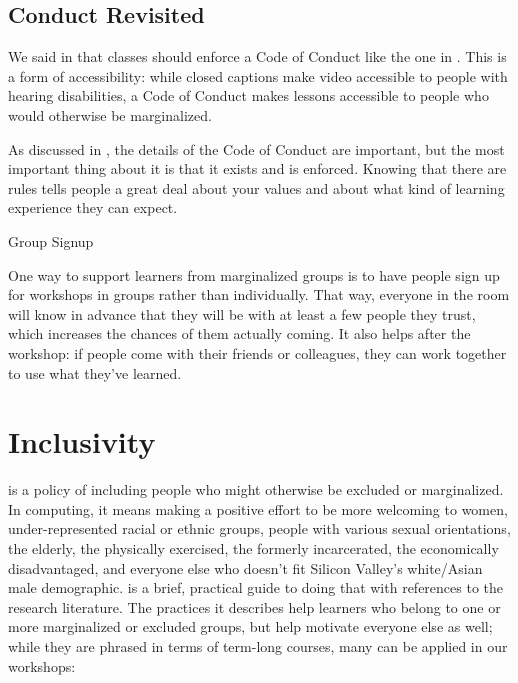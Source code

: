 \subsection*{Conduct Revisited}

We said in  that classes should
enforce a Code of Conduct like the one in .  This is
a form of accessibility: while closed captions make video accessible
to people with hearing disabilities, a Code of Conduct makes lessons
accessible to people who would otherwise be marginalized.

As discussed in , the details of the Code
of Conduct are important, but the most important thing about it is
that it exists and is enforced.  Knowing that there are rules tells
people a great deal about your values and about what kind of learning
experience they can expect.

\begin{callout}{Group Signup}

  One way to support learners from marginalized groups is to have
  people sign up for workshops in groups rather than individually.
  That way, everyone in the room will know in advance that they will
  be with at least a few people they trust, which increases the
  chances of them actually coming. It also helps after the workshop:
  if people come with their friends or colleagues, they can work
  together to use what they've learned.

\end{callout}
  
\section{Inclusivity}\label{s:motivation-inclusivity}

 is a policy of including people
who might otherwise be excluded or marginalized. In computing, it
means making a positive effort to be more welcoming to women,
under-represented racial or ethnic groups, people with various sexual
orientations, the elderly, the physically exercised, the formerly
incarcerated, the economically disadvantaged, and everyone else who
doesn't fit Silicon Valley's white/Asian male demographic.
\cite{Lee2017} is a brief, practical guide to doing that with
references to the research literature.  The practices it describes
help learners who belong to one or more marginalized or excluded
groups, but help motivate everyone else as well; while they are
phrased in terms of term-long courses, many can be applied in our
workshops:

